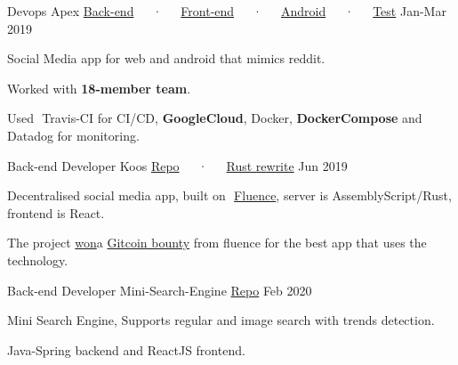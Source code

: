 

\begin{cventries}

  \cventry
    {Devops} %
    {Apex \tiny{\href{https://www.github.com/DarkGeekMS/ApeX-Server}{Back-end}~~~·~~~\href{http://www.github.com/DarkGeekMS/ApeX-Web}{Front-end}~~~·~~~\href{http://www.github.com/DarkGeekMS/ApeX-Mobile}{Android}~~~·~~~\href{https://www.github.com/DarkGeekMS/apeXTesting}{Test}}} %
    {} %
    {Jan-Mar 2019} %
    {
      \begin{cvitems} %
        \item {Social Media app for web and android that mimics reddit.}
        \item {Worked with \textbf{18-member team}.}
        \item {Used ​ Travis-CI ​for CI/CD, \textbf{​GoogleCloud​}, Docker, \textbf{​DockerCompose​} and Datadog for monitoring.}
      \end{cvitems}
    }

  \cventry
    {Back-end Developer} %
    {Koos \tiny{\href{https://gitlab.com/koos-project/koos}{Repo}~~~·~~~\href{https://gitlab.com/koos-project/koos/tree/rust-migration/server}{Rust rewrite}}} %
    {} %
    {Jun 2019} %
    {
      \begin{cvitems} %
        \item {Decentralised social media app, built on ​ \href{http://fluence.dev/}{Fluence​}, server is AssemblyScript/Rust, frontend is React.}
        \item {The project \href{https://www.linkedin.com/feed/update/urn:li:activity:6575339127934341120/}{​won​} a ​\href{https://gitcoin.co/issue/fluencelabs/Bounties/1/3290}{Gitcoin bounty​} from fluence for the best app that uses the technology.}
      \end{cvitems}
    }

  \cventry
    {Back-end Developer} %
    {Mini-Search-Engine \tiny{\href{https://github.com/mido3ds/mini-search-engine/}{Repo}}} %
    {} %
    {Feb 2020} %
    {
      \begin{cvitems} %
        \item {Mini Search Engine, Supports regular and image search with trends detection.}
        \item {Java-Spring backend and ReactJS frontend.}
      \end{cvitems}
    }


\end{cventries}
